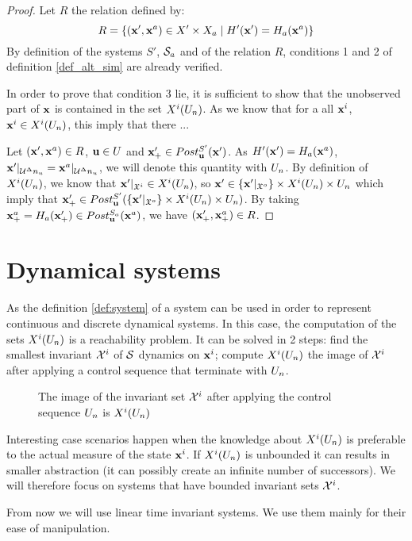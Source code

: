\begin{proof}
Let $R$ the relation defined by:
\begin{equation}
R = \{ ( \mathbf{x}', \mathbf{x}^a) \in X' \times X_a \mid H'( \mathbf{x}') = H_a( \mathbf{x}^a) \}
\end{equation}
By definition of the systems $S'$, $\mathcal{S}_a$ and of the relation $R$, conditions 1 and 2 of definition \ref{def_alt_sim} are already verified.

In order to prove that condition 3 lie, it is sufficient to show that the unobserved part of $ \mathbf{x}$ is contained in the set $X^i(U_n)$.
As we know that for a all $ \mathbf{x}^i$,$  \mathbf{x}^i \in X^i(U_n)$, this imply that there ...

Let $( \mathbf{x}', \mathbf{x}^a) \in R$, $ \mathbf{u} \in U$ and $ \mathbf{x}'_+ \in Post_{ \mathbf{u}}^{S'}( \mathbf{x}')$.
As $H'( \mathbf{x}') = H_a( \mathbf{x}^a)$, $ \mathbf{x}' |_{\mathcal{U}^\Delta n_u} =  \mathbf{x}^a |_{\mathcal{U}^\Delta n_u}$, we will denote this quantity with $U_n$.
By definition of $X^i(U_n)$,
we know that $ \mathbf{x}' |_{\mathfrak{X}^i} \in X^i(U_n)$,
so
$ \mathbf{x}' \in \{ \mathbf{x}' |_{\mathfrak{X}^o} \} \times X^i(U_n) \times U_n$
which imply that
$ \mathbf{x}'_+ \in Post_{ \mathbf{u}}^{S'}(\{ \mathbf{x}' |_{\mathfrak{X}^o} \} \times X^i(U_n) \times U_n )$.
By taking $ \mathbf{x}^a_+ = H_a( \mathbf{x}'_+) \in Post_{ \mathbf{u}}^{S_a}( \mathbf{x}^a)$,
we have $( \mathbf{x}'_+, \mathbf{x}^a_+) \in R$.
\end{proof}

\section{Dynamical systems}

As the definition \ref{def:system} of a system can be used in order to represent continuous and discrete dynamical systems.
In this case, the computation of the sets $X^i(U_n)$ is a reachability problem.
It can be solved in 2 steps: find the smallest invariant ${\mathcal{X}^i}$ of $\mathcal{S}$ dynamics on $ \mathbf{x}^i$; compute $X^i(U_n)$ the image of ${\mathcal{X}^i}$ after applying a control sequence that terminate with $U_n$.

\begin{figure}
\centering
\caption{The image of the invariant set ${\mathcal{X}^i}$ after applying the control sequence $U_n$ is $X^i(U_n)$}
\end{figure}

Interesting case scenarios happen when the knowledge about $X^i(U_n)$ is preferable to the actual measure of the state $ \mathbf{x}^i$.
If $X^i(U_n)$ is unbounded it can results in smaller abstraction (it can possibly create an infinite number of successors).
We will therefore focus on systems that have bounded invariant sets ${\mathcal{X}^i}$.

From now we will use linear time invariant systems. We use them mainly for their ease of manipulation.